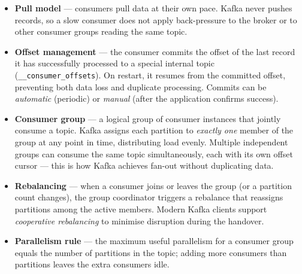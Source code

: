 \begin{itemize}
  \item \textbf{Pull model} — consumers pull data at their own pace.
        Kafka never pushes records, so a slow consumer does not apply back-pressure to the broker
        or to other consumer groups reading the same topic.
  \item \textbf{Offset management} — the consumer commits the offset of the last record it has
        successfully processed to a special internal topic (\texttt{\_\_consumer\_offsets}).
        On restart, it resumes from the committed offset, preventing both data loss and duplicate processing.
        Commits can be \emph{automatic} (periodic) or \emph{manual} (after the application confirms success).
  \item \textbf{Consumer group} — a logical group of consumer instances that jointly consume a topic.
        Kafka assigns each partition to \emph{exactly one} member of the group at any point in time,
        distributing load evenly.
        Multiple independent groups can consume the same topic simultaneously, each with its own offset cursor —
        this is how Kafka achieves fan-out without duplicating data.
  \item \textbf{Rebalancing} — when a consumer joins or leaves the group (or a partition count changes),
        the group coordinator triggers a rebalance that reassigns partitions among the active members.
        Modern Kafka clients support \emph{cooperative rebalancing} to minimise disruption during the handover.
  \item \textbf{Parallelism rule} — the maximum useful parallelism for a consumer group equals the number
        of partitions in the topic; adding more consumers than partitions leaves the extra consumers idle.
\end{itemize}
